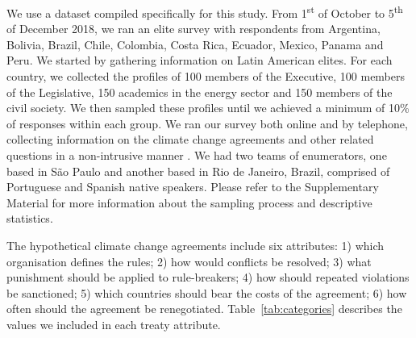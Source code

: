 \documentclass[a4paper,12pt]{article}
\begin{document}
We use a dataset compiled specifically for this study. From 1\textsuperscript{st} of October to 5\textsuperscript{th} of December 2018, we ran an elite survey with respondents from Argentina, Bolivia, Brazil, Chile, Colombia, Costa Rica, Ecuador, Mexico, Panama and Peru. We started by gathering information on Latin American elites. For each country, we collected the profiles of 100 members of the Executive, 100 members of the Legislative, 150 academics in the energy sector and 150 members of the civil society. We then sampled these profiles until we achieved a minimum of 10\% of responses within each group. We ran our survey both online and by telephone, collecting information on the climate change agreements and other related questions in a non-intrusive manner \citep{loewen2010help}. We had two teams of enumerators, one based in S\~{a}o Paulo and another based in Rio de Janeiro, Brazil, comprised of Portuguese and Spanish native speakers. Please refer to the Supplementary Material for more information about the sampling process and descriptive statistics.

The hypothetical climate change agreements include six attributes: 1) which organisation defines the rules; 2) how would conflicts be resolved; 3) what punishment should be applied to rule-breakers; 4) how should repeated violations be sanctioned; 5) which countries should bear the costs of the agreement; 6) how often should the agreement be renegotiated. Table~\ref{tab:categories} describes the values we included in each treaty attribute. \\
\end{document}
